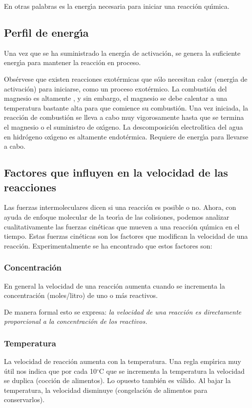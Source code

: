 En otras palabras es la energ\'{\i}a necesaria para iniciar una reacci\'on qu\'{\i}\-mica.

\subsection{Perfil de energ\'{\i}a}
Una vez que se ha suministrado la energ\'{\i}a de activaci\'on, se genera la suficiente energ\'{\i}a para mantener la reacci\'on en proceso.

Obs\'ervese que existen reacciones exot\'ermicas que s\'olo necesitan calor (e\-ner\-g\'{\i}\-a de activaci\'on) para iniciarse, como un proceso exot\'ermico. La com\-bus\-ti\'on del magnesio es altamente , y sin embargo, el magnesio se debe calentar a una temperatura bastante alta para que comience su combusti\'on.  Una vez iniciada, la reacci\'on de combusti\'on   se lleva a cabo muy vigorosamente hasta que se termina el magnesio o el sumi\-nistro de ox\'{\i}geno. La descomposici\'on electrol\'{\i}tica del agua en hidr\'ogeno  ox\'{\i}geno es altamente endot\'ermica. Requiere de energ\'{\i}a  para llevarse a cabo.

\subsection[Factores que influyen en la velocidad]{Factores que influyen en la velocidad de las reacciones}
Las fuerzas intermoleculares dicen si una reacci\'on es posible o no. Ahora, con ayuda de enfoque molecular de la teor\'{\i}a de las colisiones, podemos analizar cualitativamente las fuerzas cin\'eticas que mueven a una reacci\'on qu\'{\i}mica en el tiempo. Estas fuerzas cin\'eticas son los factores que mo\-di\-fican la velocidad de una reacci\'on. Experimentalmente se ha encontrado que estos factores son:

\subsubsection{Concentraci\'on}
En general la velocidad de una reacci\'on  aumenta cuando se incrementa la concentraci\'on (moles/litro) de uno o m\'as reactivos.

De manera formal esto se expresa: \textit{la velocidad de una reacci\'on es directamente proporcional  a la concentraci\'on de los reactivos.} 
\subsubsection{Temperatura}
La velocidad de reacci\'on aumenta con la temperatura.
Una regla emp\'{\i}rica muy \'util nos indica que por cada 10$^\circ$C que se incrementa la temperatura la velocidad se duplica (cocci\'on de alimentos).  Lo opuesto tambi\'en es v\'alido. Al bajar la temperatura, la velocidad dismi\-nuye (congelaci\'on de alimentos para conservarlos).

